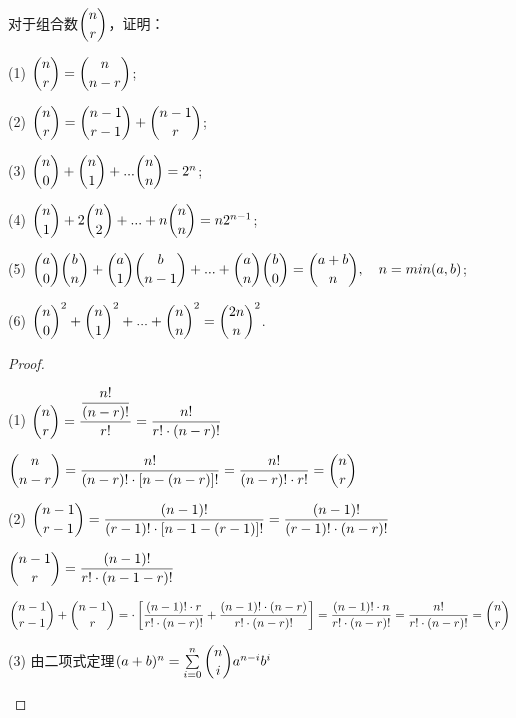 \documentclass[lang=cn,newtx,10pt,scheme=chinese]{elegantbook}
\begin{document}
\begin{problemset}[习题 1.2]
    \item 对于组合数$\dbinom{n}{r}$，证明：\vspace{6pt}
    \item[(1)] $\dbinom{n}{r} = \dbinom{n}{n-r}$;\vspace{6pt}
    \item[(2)] $\dbinom{n}{r} = \dbinom{n-1}{r-1}+\dbinom{n-1}{r}$;\vspace{6pt}
    \item[(3)] $\dbinom{n}{0} + \dbinom{n}{1} + ... \dbinom{n}{n} = 2^n$;\vspace{6pt}
    \item[(4)] $\dbinom{n}{1} + 2\dbinom{n}{2} + ... + n\dbinom{n}{n} = n2^{n-1}$;\vspace{6pt}
    \item[(5)] $\dbinom{a}{0} \dbinom{b}{n} + \dbinom{a}{1} \dbinom{b}{n-1} + ... + \dbinom{a}{n} \dbinom{b}{0} = \dbinom{a+b}{n},\quad n=min(a,b)$;\vspace{6pt}
    \item[(6)] $\dbinom{n}{0}^2 + \dbinom{n}{1}^2 + ... + \dbinom{n}{n}^2 = \dbinom{2n}{n}^2$.\vspace{6pt}
    \vspace{6pt}
    \begin{proof}
        \begin{framed}
            \item[(1)] $\dbinom{n}{r} = \dfrac{\dfrac{n!}{(n-r)!}}{r!} = \dfrac{n!}{r! \cdot (n-r)!}$\vspace{6pt}
            \item[] $\dbinom{n}{n-r} = \dfrac{n!}{(n-r)! \cdot [n-(n-r)]!} = \dfrac{n!}{(n-r)! \cdot r!} = \dbinom{n}{r}$\vspace{6pt}
            \item[(2)] $\dbinom{n-1}{r-1}=\dfrac{(n-1)!}{(r-1)! \cdot [n-1-(r-1)]!}=\dfrac{(n-1)!}{(r-1)! \cdot (n-r)!}$\vspace{6pt}
            \item[] $\dbinom{n-1}{r}=\dfrac{(n-1)!}{r! \cdot (n-1-r)!}$\vspace{6pt}
            \item[] $\dbinom{n-1}{r-1}+\dbinom{n-1}{r}=\cdot \left[\dfrac{(n-1)! \cdot r}{r! \cdot (n-r)!}+\dfrac{(n-1)! \cdot (n-r)}{r! \cdot (n-r)!}\right]=\dfrac{(n-1)! \cdot n}{r! \cdot (n-r)!} = \dfrac{n!}{r! \cdot (n-r)!} =\dbinom{n}{r}$\vspace{6pt}
            \item[(3)] 由二项式定理$(a+b)^n=\sum\limits_{i=0}^{n}{\dbinom{n}{i}a^{n-i}b^{i}}$\vspace{6pt}

\end{framed}
\end{proof}
\end{problemset}
\end{document}
